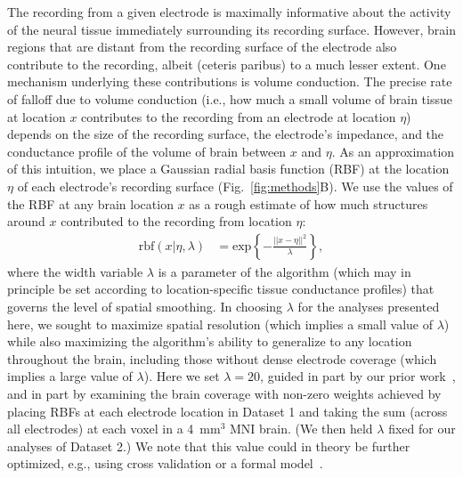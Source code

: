 \documentclass[10pt]{article}
\providecommand{\DIFaddtex}[1]{{\protect\color{blue}\uwave{#1}}} %
\providecommand{\DIFaddbegin}{} %
\providecommand{\DIFaddend}{} %
\providecommand{\DIFadd}[1]{\texorpdfstring{\DIFaddtex{#1}}{#1}} %
\newcommand{\DIFaddincludegraphics}[2][]{{\color{blue}\fbox{\DIFOincludegraphics[#1]{#2}}}} %
\DeclareRobustCommand{\DIFaddbegin}{\DIFOaddbegin \let\includegraphics\DIFaddincludegraphics} %
\DeclareRobustCommand{\DIFaddend}{\DIFOaddend \let\includegraphics\DIFOincludegraphics} %
\begin{document}
The recording from a given electrode is maximally informative about the activity
of the neural tissue immediately surrounding its recording surface.  However,
brain regions that are distant from the recording surface of the electrode also
contribute to the recording, albeit (ceteris paribus) to a much lesser extent.
One mechanism underlying these contributions is volume conduction.  The precise
rate of falloff due to volume conduction (i.e., how much a small volume of brain
tissue at location $x$ contributes to the recording from an electrode at
location $\eta$) depends on the size of the recording surface, the electrode's
impedance, and the conductance profile of the volume of brain between $x$ and
$\eta$.  As an approximation of this intuition, we place a Gaussian radial basis
function (RBF) at the location $\eta$ of each electrode's recording surface
(Fig.~\ref{fig:methods}B).  We use the values of the RBF at any brain location
$x$ as a rough estimate of how much structures around $x$ contributed to the
recording from location $\eta$: \begin{align} \mathrm{rbf}(x|\eta,\lambda) & =
\mathrm{exp}\left\{ -\frac{||x - \eta||^2}{\lambda} \right\},\label{eqn:rbf}
\end{align} where the width variable $\lambda$ is a parameter of the algorithm
(which may in principle be set according to location-specific tissue conductance
profiles) that governs the level of spatial smoothing.  In choosing $\lambda$
for the analyses presented here, we sought to maximize spatial resolution (which
implies a small value of $\lambda$) while also maximizing the algorithm's
ability to generalize to any location throughout the brain, including those
without dense electrode coverage (which implies a large value of $\lambda$).
Here we set $\lambda = 20$, guided in part by our prior \DIFaddbegin \DIFadd{related
}\DIFaddend work~\citep{MannEtal14b, MannEtal18}, and in part by examining the brain
coverage with non-zero weights achieved by placing RBFs at each electrode
location in Dataset 1 and taking the sum (across all electrodes) at each voxel
in a 4~mm$^3$ MNI brain.  (We then held $\lambda$ fixed for our analyses of
Dataset 2.)  We note that this value could in theory be further optimized, e.g.,
using cross validation or a formal model~\citep[e.g.,][]{MannEtal18}.
\end{document}
